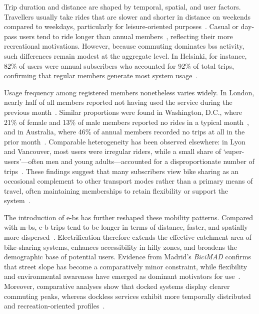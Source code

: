 Trip duration and distance are shaped by temporal, spatial, and user factors. Travellers usually take rides that are slower and shorter in distance on weekends compared to weekdays, particularly for leisure-oriented purposes~\cite{MateoBabiano2016}. Casual or day-pass users tend to ride longer than annual members~\cite{Buck2013}, reflecting their more recreational motivations. However, because commuting dominates \ac{bss} activity, such differences remain modest at the aggregate level. In Helsinki, for instance, 82\% of users were annual subscribers who accounted for 92\% of total trips, confirming that regular members generate most system usage~\cite{Willberg2021}.

Usage frequency among registered members nonetheless varies widely. In London, nearly half of all members reported not having used the service during the previous month~\cite{Fishman2016}. Similar proportions were found in Washington, D.C., where 21\% of female and 13\% of male members reported no rides in a typical month~\cite{Buck2013}, and in Australia, where 46\% of annual members recorded no trips at all in the prior month~\cite{Fishman2014}. Comparable heterogeneity has been observed elsewhere: in Lyon and Vancouver, most users were irregular riders, while a small share of ‘super-users’—often men and young adults—accounted for a disproportionate number of trips~\cite{Vogel2014, Winters2019}. These findings suggest that many subscribers view bike sharing as an occasional complement to other transport modes rather than a primary means of travel, often maintaining memberships to retain flexibility or support the system~\cite{Fishman2016}.


The introduction of \acp{e-b} has further reshaped these mobility patterns. Compared with \acp{m-b}, \ac{e-b} trips tend to be longer in terms of distance, faster, and spatially more dispersed~\cite{Yang2024}. Electrification therefore extends the effective catchment area of bike-sharing systems, enhances accessibility in hilly zones, and broadens the demographic base of potential users. Evidence from Madrid's \textit{BiciMAD} confirms that street slope has become a comparatively minor constraint, while flexibility and environmental awareness have emerged as dominant motivators for use~\cite{Julio2022}. Moreover, comparative analyses show that docked systems display clearer commuting peaks, whereas dockless services exhibit more temporally distributed and recreation-oriented profiles~\cite{Bonilla-Alicea2020}.

